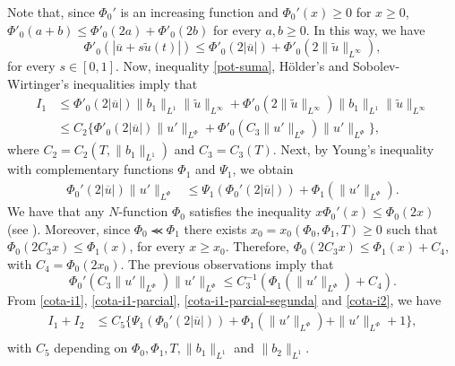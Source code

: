 \documentclass[twoside]{article}
\theoremstyle{remark}
\newcommand{\orlnor}{\|_{L^{\Phi}}}
\renewcommand{\leq}{\leqslant}
\renewcommand{\geq}{\geqslant}
\begin{document}
Note that, since $\Phi_0'$ is an increasing function  and $\Phi_0'(x)\geq 0$ for $x\geq 0$, 
$\Phi'_0(a+b)\leq \Phi'_0(2a)+\Phi'_0(2b)$ for every $a,b\geq 0$.
In this way, we have
\begin{equation}\label{pot-suma}
\Phi'_0(|\overline{u}+s\tilde{u}(t)|)\leq
\Phi'_0(2|\overline{u}|)+\Phi'_0(2\|\tilde{u}\|_{L^{\infty}}),
\end{equation}
for every $s \in [0,1]$.  Now,  inequality \eqref{pot-suma}, H\"older's and Sobolev-Wirtinger's inequalities imply that
\begin{equation}\label{cota-i1}
\begin{split}
I_1&
\leq \Phi'_0(2|\overline{u}|) \|b_1\|_{L^1} \|\tilde{u}\|_{L^{\infty}}+\Phi'_0(2\|\tilde{u}\|_{L^\infty})
 \|b_1\|_{L^1}\|\tilde{u}\|_{L^\infty}
\\
&\leq C_2 \bigg\{ \Phi'_0(2|\overline{u}|) \|u'\orlnor
+\Phi'_0(C_3\|u'\orlnor) \|u'\orlnor\bigg\},
\end{split}
\end{equation}
where $C_2=C_2(T, \|b_1\|_{L^1} )$ and $C_3=C_3(T)$. 
Next, by Young's inequality with complementary functions $\Phi_1$ and $\Psi_1$, we obtain
%
\begin{equation}\label{cota-i1-parcial}
 \begin{split}
\Phi_0'(2|\overline{u}|) \|u'\orlnor
&\leq 
\Psi_1(\Phi_0'(2|\overline{u}|))+
\Phi_1(\|u'\orlnor).
\end{split}
\end{equation}
%
We have that any $N$-function $\Phi_0$ satisfies the inequality $x\Phi_0'(x)\leq \Phi_0(2x)$ (see \cite[p. 17]{rao1991theory} ). Moreover, since $\Phi_0\llcurly\Phi_1$ there exists $x_0=x_0(\Phi_0,\Phi_1,T)\geq 0$ such that $\Phi_0(2C_3x)\leq \Phi_1(x)$, for every $x\geq x_0$. Therefore, $\Phi_0(2C_3x)\leq \Phi_1(x)+C_4$, with $C_4=\Phi_0(2x_0)$. The previous observations imply that
\begin{equation}\label{cota-i1-parcial-segunda}
\Phi_0'(C_3\|u'\orlnor) \|u'\orlnor
\leq 
C_3^{-1}(\Phi_1(\|u'\orlnor)+C_4).
\end{equation}
From \eqref{cota-i1}, \eqref{cota-i1-parcial}, \eqref{cota-i1-parcial-segunda} and \eqref{cota-i2}, we have
\begin{equation}\label{cota-i1-i2}
\begin{split}
I_1+I_2
&
\leq C_5
\bigg\{ 
\Psi_1(\Phi_0'(2|\overline{u}|))
+\Phi_1(\|u'\orlnor)
+\|u'\orlnor +1
\bigg\},\\
\end{split}
\end{equation}
with $C_5$ depending on $\Phi_0, \Phi_1, T, \|b_1\|_{L^1}$ and $\|b_2\|_{L^1} $.
\end{document}
